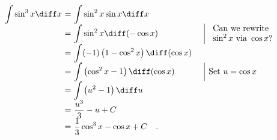 \begin{frame}
\begin{example}
$
\begin{array}{r@{~}c@{~}ll|l}
\displaystyle\int \sin^3 x \diff x&=&\displaystyle \int \sin^2 x \sin x \diff x\\
&=&\displaystyle \int \sin^2 x \diff (-\cos x)&&\begin{array}{l} \text{Can we rewrite } \\ \sin^2x  \text{ via }  \cos x \text{?}\end{array}\\
&=&\displaystyle \int (-1)\left(1-\cos^2 x\right)\diff (\cos x)\\
&=&\displaystyle \int \left(\cos^2 x-1\right)\diff (\cos x)&&\text{Set } u=\cos x\\
&=&\displaystyle \int \left( u^2-1\right)\diff u\\
&=&\displaystyle \frac{u^3}{3}-u+C\\
&=&\displaystyle \frac{1}{3}\cos^3 x-\cos x+C\quad .
\end{array}
$


\end{example}
\end{frame}
